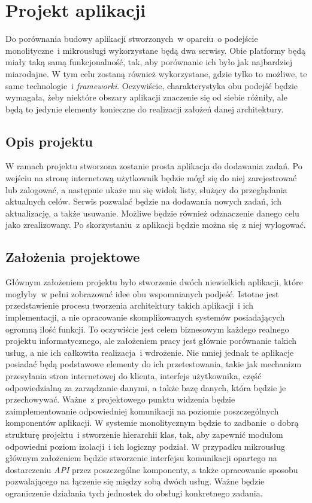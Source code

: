 \chapter{Projekt aplikacji}
\label{roz3}
Do porównania budowy aplikacji stworzonych~w oparciu~o podejście monolityczne~i mikrousługi wykorzystane będą dwa serwisy. Obie platformy będą miały taką samą funkcjonalność, tak, aby porównanie ich było jak najbardziej miarodajne. W tym celu zostaną również wykorzystane, gdzie tylko to możliwe, te same technologie~i \textit{frameworki}. Oczywiście, charakterystyka obu podejść będzie wymagała, żeby niektóre obszary aplikacji znaczenie się od siebie różniły, ale będą to jedynie elementy konieczne do realizacji założeń danej architektury.

\section{Opis projektu}
W ramach projektu stworzona zostanie prosta aplikacja do dodawania zadań. Po wejściu na stronę internetową użytkownik będzie mógł się do niej zarejestrować lub zalogować, a następnie ukaże mu się widok listy, służący do przeglądania aktualnych celów. Serwis pozwalać będzie na dodawania nowych zadań, ich aktualizację, a także usuwanie. Możliwe będzie również odznaczenie danego celu jako zrealizowany. Po skorzystaniu~z aplikacji będzie można się~z niej wylogować.

\section{Założenia projektowe}
Głównym założeniem projektu było stworzenie dwóch niewielkich aplikacji, które mogłyby~w pełni zobrazować idee obu wspomnianych podjeść. Istotne jest przedstawienie procesu tworzenia architektury takich aplikacji~i ich implementacji, a nie opracowanie skomplikowanych systemów posiadających ogromną ilość funkcji. To oczywiście jest celem biznesowym każdego realnego projektu informatycznego, ale założeniem pracy jest głównie porównanie takich usług, a nie ich całkowita realizacja~i wdrożenie. Nie mniej jednak te aplikacje posiadać będą podstawowe elementy do ich przetestowania, takie jak mechanizm przesyłania stron internetowej do klienta, interfejs użytkownika, część odpowiedzialną za zarządzanie danymi, a także bazę danych, która będzie je przechowywać. Ważne~z projektowego punktu widzenia będzie zaimplementowanie odpowiedniej komunikacji na poziomie poszczególnych komponentów aplikacji. W systemie monolitycznym będzie to zadbanie~o dobrą strukturę projektu~i stworzenie hierarchii klas, tak, aby zapewnić modułom odpowiedni poziom izolacji~i ich logiczny podział. W przypadku mikrousług głównym założeniem będzie stworzenie interfejsu komunikacji opartego na dostarczeniu \textit{API} przez poszczególne komponenty, a także opracowanie sposobu pozwalającego na łączenie się między sobą dwóch usług. Ważne będzie ograniczenie działania tych jednostek do obsługi konkretnego zadania.

